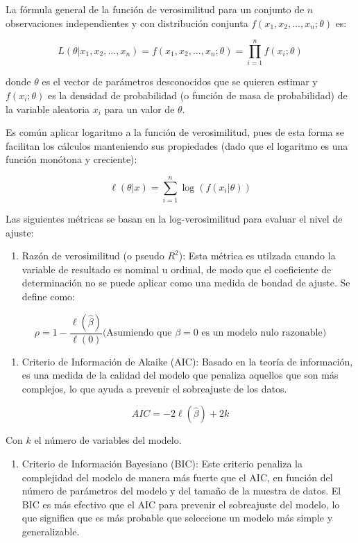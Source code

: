 \documentclass[
]{book}
\providecommand{\tightlist}{%
  \setlength{\itemsep}{0pt}\setlength{\parskip}{0pt}}
\begin{document}
La fórmula general de la función de verosimilitud para un conjunto de
\(n\) observaciones independientes y con distribución conjunta
\(f(x_1, x_2, ..., x_n; θ)\) es:

\[L(\theta | x_1, x_2, ..., x_n) = f(x_1, x_2, ..., x_n; \theta) = \prod_{i=1}^{n} f(x_i;\theta)\]

donde \(θ\) es el vector de parámetros desconocidos que se quieren estimar
y \(f(x_i; θ)\) es la densidad de probabilidad (o función de masa de
probabilidad) de la variable aleatoria \(x_i\) para un valor de \(θ\).

Es común aplicar logaritmo a la función de verosimilitud, pues de esta
forma se facilitan los cálculos manteniendo sus propiedades (dado que el
logaritmo es una función monótona y creciente):

\[\ell(\theta | x) = \sum_{i=1}^{n} \log(f(x_i|\theta))\]

Las siguientes métricas se basan en la log-verosimilitud para evaluar el
nivel de ajuste:

\begin{enumerate}
\def\labelenumi{\arabic{enumi}.}
\tightlist
\item
  Razón de verosimilitud (o pseudo \(R^2\)): Esta métrica es utilzada
  cuando la variable de resultado es nominal u ordinal, de modo que el
  coeficiente de determinación no se puede aplicar como una medida de
  bondad de ajuste. Se define como:
\end{enumerate}

\[\rho = 1 - \frac{\ell(\hat{\beta})}{\ell(0)} \text{(Asumiendo que $\beta=0$ es un modelo nulo razonable)}\]

\begin{enumerate}
\def\labelenumi{\arabic{enumi}.}
\setcounter{enumi}{1}
\tightlist
\item
  Criterio de Información de Akaike (AIC): Basado en la teoría de
  información, es una medida de la calidad del modelo que penaliza
  aquellos que son más complejos, lo que ayuda a prevenir el
  sobreajuste de los datos.
\end{enumerate}

\[AIC = -2\ell({\hat{\beta}}) + 2k\]

Con \(k\) el número de variables del modelo.

\begin{enumerate}
\def\labelenumi{\arabic{enumi}.}
\setcounter{enumi}{2}
\tightlist
\item
  Criterio de Información Bayesiano (BIC): Este criterio penaliza la
  complejidad del modelo de manera más fuerte que el AIC, en función
  del número de parámetros del modelo y del tamaño de la muestra de
  datos. El BIC es más efectivo que el AIC para prevenir el
  sobreajuste del modelo, lo que significa que es más probable que
  seleccione un modelo más simple y generalizable.
\end{enumerate}
\end{document}

